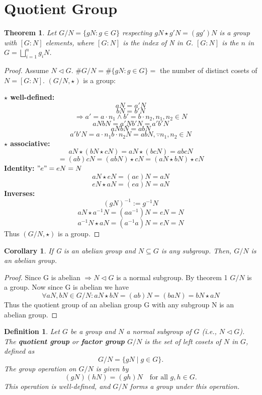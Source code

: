 \documentclass[12pt]{article}
\newtheorem{theorem}{Theorem}
\newtheorem{corollary}{Corollary}
\newtheorem{definition}{Definition}
\begin{document}
\section*{Quotient Group}
\begin{theorem}
    Let \(G / N = \{gN : g \in G\}\) respecting \(gN \star g'N = (gg')N\) is 
    a group with \([G:N]\) elements, where \([G:N]\) is the index of N in G. 
    \([G:N]\) is the \(n\) in \(G = \bigsqcup^n_{i = 1} g_iN\).
\end{theorem}
\begin{proof}
    Assume \(N \triangleleft G\).
    \(\# G / N = \#\{gN : g \in G\} = \)     
    the number of distinct cosets of \(N = [G:N]\). 
    \(\left( G / N, \star \right)\) is a group: 

    \noindent 
    \textbf{\(\star\) well-defined: }
    \[ 
        aN = a'N
    \]
    \[ 
        bN = b'N 
    \]
    \[ 
        \Rightarrow a' = a \cdot n_1 \land b' = b \cdot n_2, n_1,n_2 \in N  
    \]
    \[ 
        aNbN = a'Nb'N = a'b'N
    \]
    \[ 
        aNbN = abN
    \]
    \[ 
        a'b'N = a \cdot n_1 b \cdot n_2N = abN, \because n_1,n_2 \in N
    \]
    \textbf{\(\star\) associative: }
    \[ 
        aN \star (bN \star cN) = aN \star (bcN) = abcN 
    \]
    \[ 
        = (ab)cN = (abN) \star cN = (aN \star bN) \star cN
    \]
    \textbf{Identity:}
    \("e" = eN = N\)
    \[ 
        aN \star eN = (ae)N = aN
    \]
    \[ 
        eN \star aN = (ea)N = aN
    \]
    \textbf{Inverses:}
    \[ 
        (gN)^{-1} := g^{-1}N
    \]
    \[
        aN \star a^{-1}N = (aa^{-1})N = eN = N
    \]
    \[ 
        a^{-1}N \star aN = (a^{-1}a)N = eN = N
    \]
    Thus \(\left( G / N, \star\right)\) is a group.
    
\end{proof}

\begin{corollary}
    If G is an abelian group and \(N \subseteq G\) is any subgroup. 
    Then, \(G / N\) is an abelian group.
\end{corollary}
\begin{proof}
    Since G is abelian \(\Rightarrow N \triangleleft G\) is a normal subgroup. 
    By theorem 1 \(G / N\) is a group.
    Now since G is abelian we have 
    \[ 
        \forall aN,bN \in G/N : aN \star bN = (ab)N = (baN) = bN \star aN
    \]
    Thus the quotient group of an abelian group G with any subgroup N is an 
    abelian group.
\end{proof}



\begin{definition}
    Let \( G \) be a group and \( N \) a normal subgroup of \( G \) 
    (i.e., \( N \triangleleft G \)). 
    The \textbf{quotient group} or \textbf{factor group} \( G/N \) 
    is the set of left cosets of \( N \) in \( G \), defined as
    \[
        G/N = \{ gN \mid g \in G \}.
    \]
    The group operation on \( G/N \) is given by
    \[
        (gN)(hN) = (gh)N \quad \text{for all } g,h \in G.
    \]
    This operation is well-defined, and \( G/N \) forms a group under this operation.
\end{definition}
\end{document}
